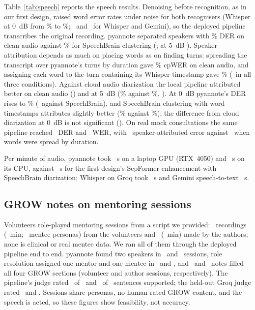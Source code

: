 Table~\ref{tab:speech} reports the speech results. Denoising before recognition, as in our first design, raised word error rates under noise for both recognisers (Whisper at 0~dB from \ResAudioWerGroqRawZero\% to \ResAudioWerGroqEnhZero\%; \ResSigWerWhisperZeroP\ and \ResSigWerGeminiZeroP\ for Whisper and Gemini), so the deployed pipeline transcribes the original recording. pyannote separated speakers with \ResAudioDerPyaClean\% DER on clean audio against \ResAudioDerSbRawClean\% for SpeechBrain clustering (\ResSigDerPyaCleanP; at 5~dB \ResSigDerPyaFiveP). Speaker attribution depends as much on placing words as on finding turns: spreading the transcript over pyannote's turns by duration gave \ResAudioCpPyaPropClean\% cpWER on clean audio, and assigning each word to the turn containing its Whisper timestamp gave \ResAudioCpPyaWordsClean\% (\ResSigWordsDurCleanP\ in all three conditions). Against cloud audio diarization the local pipeline attributed better on clean audio (\ResSigWordsCloudCleanP) and at 5~dB (\ResAudioCpPyaWordsFive\% against \ResAudioCpGemAudioFive\%, \ResSigWordsCloudFiveP). At 0~dB pyannote's DER rises to \ResAudioDerPyaZero\% (\ResSigDerPyaZeroP\ against SpeechBrain), and SpeechBrain clustering with word timestamps attributes slightly better (\ResAudioCpSbWordsZero\% against \ResAudioCpPyaWordsZero\%); the difference from cloud diarization at 0~dB is not significant (\ResSigWordsCloudZeroP). On real mock consultations the same pipeline reached \ResPmDer\ DER and \ResPmWer\ WER, with \ResPmCpWords\ speaker-attributed error against \ResPmCpDuration\ when words were spread by duration.

Per minute of audio, pyannote took \ResLatPyaGpu~s on a laptop GPU (RTX~4050) and \ResLatPyaCpu~s on its CPU, against \ResLatSbEnh~s for the first design's SepFormer enhancement with SpeechBrain diarization; Whisper on Groq took \ResLatSttGroq~s and Gemini speech-to-text \ResLatSttGem~s.

\ifmentoring
\subsection{GROW notes on mentoring sessions}
Volunteers role-played mentoring sessions from a script we provided: \ResMenSessions\ recordings (\ResMenMinutes~min; \ResMenMentees\ mentee personas) from the volunteers and \ResRpSessions\ (\ResRpMinutes~min) made by the authors; none is clinical or real mentee data. We ran all of them through the deployed pipeline end to end. pyannote found two speakers in \ResMenTwoSpk\ and \ResRpTwoSpk\ sessions, role resolution assigned one mentor and one mentee in \ResMenRoles\ and \ResRpRoles, and \ResMenGrowAll\ and \ResRpGrowAll\ notes filled all four GROW sections (volunteer and author sessions, respectively). The pipeline's judge rated \ResMenSupported\ of \ResMenSentences\ and \ResRpSupported\ of \ResRpSentences\ sentences supported; the held-out Groq judge rated \ResMenHeldSupported\ and \ResRpHeldSupported. Sessions share personas, no human rated GROW content, and the speech is acted, so these figures show feasibility, not accuracy.
\fi
